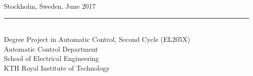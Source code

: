 \begin{titlepage}
\begin{center}
  \large Stockholm, Sweden, June 2017 \\
  \rule{250pt}{2pt} \\
  Degree Project in Automatic Control, Second Cycle (EL205X) \\
  \large Automatic Control Department \\
  \large School of Electrical Engineering \\
  \large KTH Royal Institute of Technology

\end{center}
\end{titlepage}
